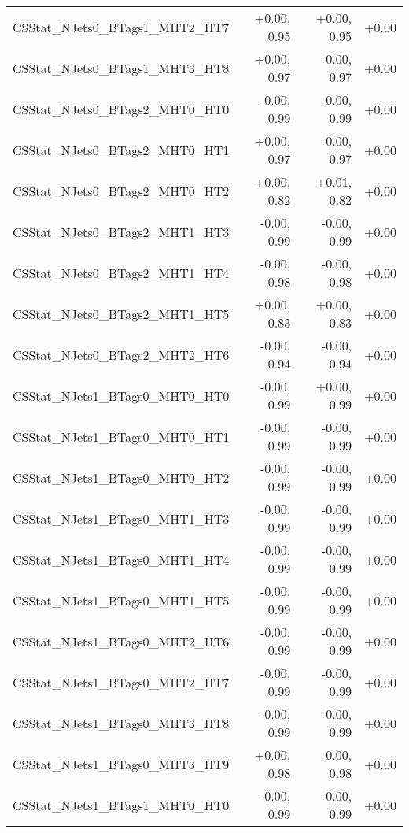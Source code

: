 \begin{tabular}{|l|r|r|r|}
CSStat\_NJets0\_BTags1\_MHT2\_HT7        &      +0.00, 0.95 &     +0.00, 0.95 &  +0.00 \\
CSStat\_NJets0\_BTags1\_MHT3\_HT8        &      +0.00, 0.97 &     -0.00, 0.97 &  +0.00 \\
CSStat\_NJets0\_BTags2\_MHT0\_HT0        &      -0.00, 0.99 &     -0.00, 0.99 &  +0.00 \\
CSStat\_NJets0\_BTags2\_MHT0\_HT1        &      +0.00, 0.97 &     -0.00, 0.97 &  +0.00 \\
CSStat\_NJets0\_BTags2\_MHT0\_HT2        &      +0.00, 0.82 &     +0.01, 0.82 &  +0.00 \\
CSStat\_NJets0\_BTags2\_MHT1\_HT3        &      -0.00, 0.99 &     -0.00, 0.99 &  +0.00 \\
CSStat\_NJets0\_BTags2\_MHT1\_HT4        &      -0.00, 0.98 &     -0.00, 0.98 &  +0.00 \\
CSStat\_NJets0\_BTags2\_MHT1\_HT5        &      +0.00, 0.83 &     +0.00, 0.83 &  +0.00 \\
CSStat\_NJets0\_BTags2\_MHT2\_HT6        &      -0.00, 0.94 &     -0.00, 0.94 &  +0.00 \\
CSStat\_NJets1\_BTags0\_MHT0\_HT0        &      -0.00, 0.99 &     +0.00, 0.99 &  +0.00 \\
CSStat\_NJets1\_BTags0\_MHT0\_HT1        &      -0.00, 0.99 &     -0.00, 0.99 &  +0.00 \\
CSStat\_NJets1\_BTags0\_MHT0\_HT2        &      -0.00, 0.99 &     -0.00, 0.99 &  +0.00 \\
CSStat\_NJets1\_BTags0\_MHT1\_HT3        &      -0.00, 0.99 &     -0.00, 0.99 &  +0.00 \\
CSStat\_NJets1\_BTags0\_MHT1\_HT4        &      -0.00, 0.99 &     -0.00, 0.99 &  +0.00 \\
CSStat\_NJets1\_BTags0\_MHT1\_HT5        &      -0.00, 0.99 &     -0.00, 0.99 &  +0.00 \\
CSStat\_NJets1\_BTags0\_MHT2\_HT6        &      -0.00, 0.99 &     -0.00, 0.99 &  +0.00 \\
CSStat\_NJets1\_BTags0\_MHT2\_HT7        &      -0.00, 0.99 &     -0.00, 0.99 &  +0.00 \\
CSStat\_NJets1\_BTags0\_MHT3\_HT8        &      -0.00, 0.99 &     -0.00, 0.99 &  +0.00 \\
CSStat\_NJets1\_BTags0\_MHT3\_HT9        &      +0.00, 0.98 &     -0.00, 0.98 &  +0.00 \\
CSStat\_NJets1\_BTags1\_MHT0\_HT0        &      -0.00, 0.99 &     -0.00, 0.99 &  +0.00 \\

\end{tabular}
